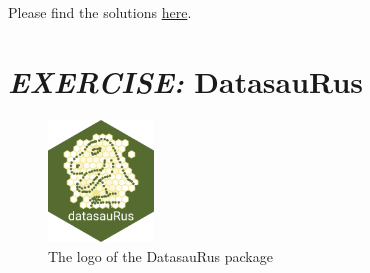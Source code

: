 \documentclass[
  12pt,
  oneside]{book}
\begin{document}
Please find the solutions \href{https://raw.githubusercontent.com/hubchev/courses/main/scr/exe_poser.R}{here}.

\hypertarget{exercise-datasaurus}{%
\section*{\texorpdfstring{\emph{EXERCISE:} DatasauRus}{EXERCISE: DatasauRus}}\label{exercise-datasaurus}}

\begin{figure}
\centering
\includegraphics[width=0.25\textwidth,height=\textheight]{fig/datasaurus.png}
\caption[\label{fig:label} The logo of the DatasauRus package]{\label{fig:label} The logo of the DatasauRus package\footnotemark{}}
\end{figure}
\end{document}
